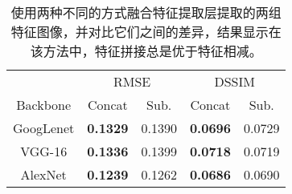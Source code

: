 \begin{table}[t]
    \centering
    \begin{tabular}{c|cc|cc} 
     \hline
        ~&\multicolumn{2}{c|}{RMSE}&\multicolumn{2}{c}{DSSIM}\\
        Backbone & Concat & Sub. & Concat &Sub.\\
    \hline
    GoogLenet & \textbf{0.1329} & 0.1390 & \textbf{0.0696} & 0.0729 \\ \hline
    VGG-16    & \textbf{0.1336} & 0.1399 & \textbf{0.0718} & 0.0719 \\ \hline
    AlexNet   & \textbf{0.1239} & 0.1262 & \textbf{0.0686} & 0.0690 \\ \hline
    \end{tabular}
    \caption[特征融合方式对光照估计的影响]{
    \label{table:fusion-method}
    使用两种不同的方式融合特征提取层提取的两组特征图像，并对比它们之间的差异，结果显示在该方法中，特征拼接总是优于特征相减。}
\end{table}

